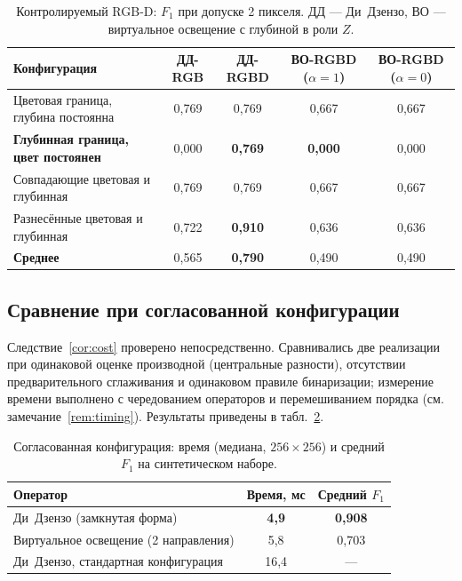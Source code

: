 \documentclass[11pt,a4paper]{article}
\theoremstyle{plain}
\theoremstyle{definition}
\theoremstyle{remark}
\begin{document}
\begin{table}[h]
\centering
\caption{Контролируемый RGB-D: $F_1$ при допуске 2 пикселя. ДД --- Ди~Дзензо,
ВО --- виртуальное освещение с глубиной в роли $Z$.}
\label{tab:rgbd}
\begin{tabular}{lcccc}
\toprule
Конфигурация & ДД-RGB & ДД-RGBD & ВО-RGBD ($\alpha{=}1$) & ВО-RGBD ($\alpha{=}0$) \\
\midrule
Цветовая граница, глубина постоянна & 0{,}769 & 0{,}769 & 0{,}667 & 0{,}667 \\
\textbf{Глубинная граница, цвет постоянен} & 0{,}000 & \textbf{0{,}769} & \textbf{0{,}000} & 0{,}000 \\
Совпадающие цветовая и глубинная    & 0{,}769 & 0{,}769 & 0{,}667 & 0{,}667 \\
Разнесённые цветовая и глубинная    & 0{,}722 & \textbf{0{,}910} & 0{,}636 & 0{,}636 \\
\midrule
\textbf{Среднее}                    & 0{,}565 & \textbf{0{,}790} & 0{,}490 & 0{,}490 \\
\bottomrule
\end{tabular}
\end{table}

\subsection{Сравнение при согласованной конфигурации}
\label{sec:matched}

Следствие~\ref{cor:cost} проверено непосредственно. Сравнивались две
реализации при одинаковой оценке производной (центральные разности),
отсутствии предварительного сглаживания и одинаковом правиле бинаризации;
измерение времени выполнено с чередованием операторов и перемешиванием
порядка (см. замечание~\ref{rem:timing}). Результаты приведены в
табл.~\ref{tab:matched}.

\begin{table}[h]
\centering
\caption{Согласованная конфигурация: время (медиана, $256\times256$) и
средний $F_1$ на синтетическом наборе.}
\label{tab:matched}
\begin{tabular}{lcc}
\toprule
Оператор & Время, мс & Средний $F_1$ \\
\midrule
Ди~Дзензо (замкнутая форма)              & \textbf{4{,}9} & \textbf{0{,}908} \\
Виртуальное освещение (2 направления)    & 5{,}8 & 0{,}703 \\
\midrule
Ди~Дзензо, стандартная конфигурация      & 16{,}4 & --- \\
\bottomrule
\end{tabular}
\end{table}
\end{document}
